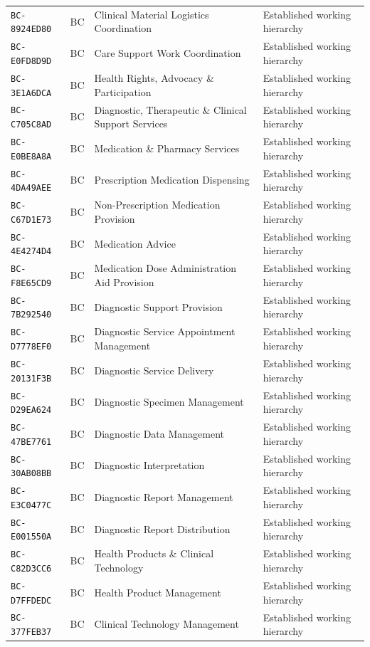 \documentclass[11pt,a4paper,openany]{book}
\begin{document}
\begin{longtable}{@{}p{.19\linewidth}p{.12\linewidth}p{.39\linewidth}p{.24\linewidth}@{}}
\texttt{BC-8924ED80} & BC & Clinical Material Logistics Coordination & Established working hierarchy \\
\texttt{BC-E0FD8D9D} & BC & Care Support Work Coordination & Established working hierarchy \\
\texttt{BC-3E1A6DCA} & BC & Health Rights, Advocacy \& Participation & Established working hierarchy \\
\texttt{BC-C705C8AD} & BC & Diagnostic, Therapeutic \& Clinical Support Services & Established working hierarchy \\
\texttt{BC-E0BE8A8A} & BC & Medication \& Pharmacy Services & Established working hierarchy \\
\texttt{BC-4DA49AEE} & BC & Prescription Medication Dispensing & Established working hierarchy \\
\texttt{BC-C67D1E73} & BC & Non-Prescription Medication Provision & Established working hierarchy \\
\texttt{BC-4E4274D4} & BC & Medication Advice & Established working hierarchy \\
\texttt{BC-F8E65CD9} & BC & Medication Dose Administration Aid Provision & Established working hierarchy \\
\texttt{BC-7B292540} & BC & Diagnostic Support Provision & Established working hierarchy \\
\texttt{BC-D7778EF0} & BC & Diagnostic Service Appointment Management & Established working hierarchy \\
\texttt{BC-20131F3B} & BC & Diagnostic Service Delivery & Established working hierarchy \\
\texttt{BC-D29EA624} & BC & Diagnostic Specimen Management & Established working hierarchy \\
\texttt{BC-47BE7761} & BC & Diagnostic Data Management & Established working hierarchy \\
\texttt{BC-30AB08BB} & BC & Diagnostic Interpretation & Established working hierarchy \\
\texttt{BC-E3C0477C} & BC & Diagnostic Report Management & Established working hierarchy \\
\texttt{BC-E001550A} & BC & Diagnostic Report Distribution & Established working hierarchy \\
\texttt{BC-C82D3CC6} & BC & Health Products \& Clinical Technology & Established working hierarchy \\
\texttt{BC-D7FFDEDC} & BC & Health Product Management & Established working hierarchy \\
\texttt{BC-377FEB37} & BC & Clinical Technology Management & Established working hierarchy \\

\end{longtable}
\end{document}
